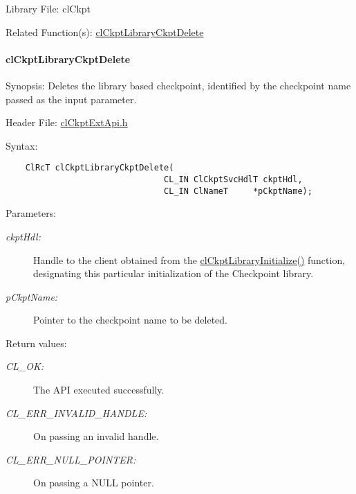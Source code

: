 \begin{Desc}
\item[Library File:]cl\-Ckpt\end{Desc}
\begin{Desc}
\item[Related Function(s):]\hyperlink{group__group10}{cl\-Ckpt\-Library\-Ckpt\-Delete} \end{Desc}
\hypertarget{pageckpt204}{}\paragraph{cl\-Ckpt\-Library\-Ckpt\-Delete}\label{pageckpt204}
\begin{Desc}
\item[Synopsis:]Deletes the library based checkpoint, identified by the checkpoint name passed as the input parameter.\end{Desc}
\begin{Desc}
\item[Header File:]\hyperlink{cl_ckpt_ext_api_8h}{cl\-Ckpt\-Ext\-Api.h}\end{Desc}
\begin{Desc}
\item[Syntax:]

\footnotesize\begin{verbatim}    ClRcT clCkptLibraryCkptDelete(
                                CL_IN ClCkptSvcHdlT ckptHdl,
                                CL_IN ClNameT     *pCkptName);
\end{verbatim}
\normalsize
\end{Desc}
\begin{Desc}
\item[Parameters:]
\begin{description}
\item[{\em ckpt\-Hdl:}]Handle to the client obtained from the \hyperlink{group__group10_ga2}{cl\-Ckpt\-Library\-Initialize()} function, designating this particular initialization of the Checkpoint library. \item[{\em p\-Ckpt\-Name:}]Pointer to the checkpoint name to be deleted.\end{description}
\end{Desc}
\begin{Desc}
\item[Return values:]
\begin{description}
\item[{\em CL\_\-OK:}]The API executed successfully. \item[{\em CL\_\-ERR\_\-INVALID\_\-HANDLE:}]On passing an invalid handle. \item[{\em CL\_\-ERR\_\-NULL\_\-POINTER:}]On passing a NULL pointer.\end{description}
\end{Desc}
